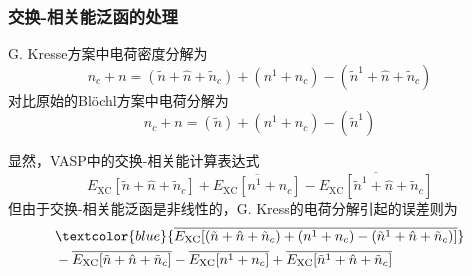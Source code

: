 \frame
{
\frametitle{交换-相关能泛函的处理}
\textrm{G. Kresse}方案中电荷密度分解为
\begin{displaymath}
	n_c+n=(\tilde n+\hat n+\tilde n_c)+(n^1+n_c)-(\tilde n^1+\hat n+\tilde n_c)
\end{displaymath}
对比原始的\textrm{Bl\"ochl}方案中电荷分解为
\begin{displaymath}
	n_c+n=(\tilde n)+(n^1+n_c)-(\tilde n^1)
\end{displaymath}

显然，\textrm{VASP}中的交换-相关能计算表达式
\begin{displaymath}
	E_{\mathrm{XC}}[\tilde n+\hat n+\tilde n_c]+\overline{E_{\mathrm{XC}}[n^1+n_c]}-\overline{E_{\mathrm{XC}}[\tilde n^1+\hat n+\tilde n_c]}
\end{displaymath}
但由于交换-相关能泛函是非线性的，\textrm{G. Kress}的电荷分解引起的误差则为
\begin{displaymath}
	\begin{aligned}
		&\textcolor{blue}{\overline{E_{\mathrm{XC}}[(\tilde n+\hat n+\tilde n_c)+(n^1+n_c)-(\tilde n^1+\hat n+\tilde n_c)]}}\\
		&-\overline{E_{\mathrm{XC}}[\tilde n+\hat n+\tilde n_c]}-\overline{E_{\mathrm{XC}}[n^1+n_c]}+\overline{E_{\mathrm{XC}}[\tilde n^1+\hat n+\tilde n_c]}
	\end{aligned}
\end{displaymath}
}

